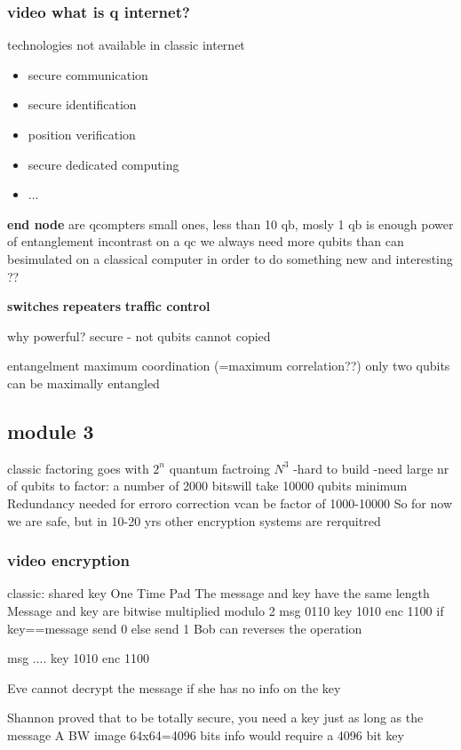 \documentclass[../../main.tex]{subfiles}
\begin{document}
\subsubsection*{video what is q internet?}
technologies not available in classic internet
\begin{itemize}
\item secure communication
\item secure identification
\item position verification
\item secure dedicated computing
\item ...
\end{itemize}
\textbf{end node} are qcompters small ones, less than 10 qb, mosly 1 qb is enough
power of entanglement
incontrast on a qc we always need more qubits than can besimulated on a classical computer in order to do something new and interesting ??

\textbf{switches}
\textbf{repeaters}
\textbf{traffic control}

why powerful?
secure - not qubits cannot copied

entangelment
maximum coordination (=maximum correlation??)
only two qubits can be maximally entangled

\subsection*{module 3}
classic factoring goes with $2^n$ 
quantum factroing $N^3$
-hard to build
-need large nr of qubits to factor: a number of 2000 bitswill take 10000 qubits minimum
Redundancy needed for erroro correction vcan be factor of 1000-10000
So for now we are safe, but in 10-20 yrs other encryption systems are rerquitred

\subsubsection*{video encryption}
classic: shared key
One Time Pad
The message and key have the same length
Message and key are bitwise multiplied modulo 2
msg 0110
key 1010
enc 1100
if key==message send 0 else send 1
Bob can reverses the operation

msg ....
key 1010
enc 1100

Eve cannot decrypt the message if she has no info on the key


Shannon proved that to be totally secure, you need a key just as long as the message
A BW image 64x64=4096 bits info would require a 4096 bit key
\end{document}
